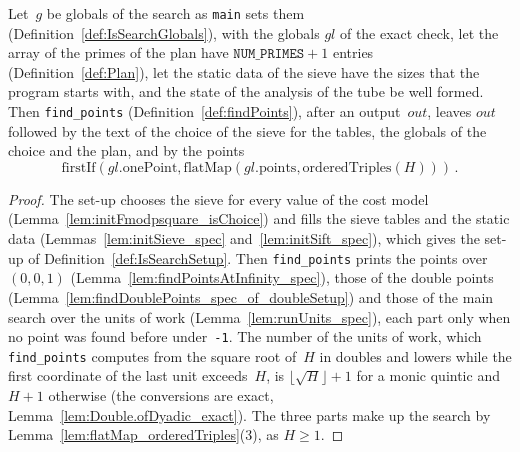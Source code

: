 \begin{lemma}\label{lem:findPoints_spec}
  \leanok
  Let~$g$ be globals of the search as \texttt{main} sets them
  (Definition~\ref{def:IsSearchGlobals}), with the globals $\mathit{gl}$ of the exact check, let
  the array of the primes of the plan have $\texttt{NUM\_PRIMES} + 1$ entries
  (Definition~\ref{def:Plan}), let the static data of the sieve have the sizes that the program
  starts with, and the state of the analysis of the tube be well formed. Then
  \texttt{find\_points} (Definition~\ref{def:findPoints}), after an output~$\mathit{out}$, leaves
  $\mathit{out}$ followed by the text of the choice of the sieve for the tables, the globals of the
  choice and the plan, and by the points
  \[ \mathrm{firstIf}(\mathit{gl}.\mathrm{onePoint}, \mathrm{flatMap}(\mathit{gl}.\mathrm{points},
     \mathrm{orderedTriples}(H)))\,. \]
\end{lemma}

\begin{proof}
  \leanok
  The set-up chooses the sieve for every value of the cost model
  (Lemma~\ref{lem:initFmodpsquare_isChoice}) and fills the sieve tables and the static data
  (Lemmas~\ref{lem:initSieve_spec} and~\ref{lem:initSift_spec}), which gives the set-up of
  Definition~\ref{def:IsSearchSetup}. Then \texttt{find\_points} prints the points over
  $(0, 0, 1)$ (Lemma~\ref{lem:findPointsAtInfinity_spec}), those of the double points
  (Lemma~\ref{lem:findDoublePoints_spec_of_doubleSetup}) and those of the main search over the
  units of work (Lemma~\ref{lem:runUnits_spec}), each part only when no point was found before
  under~\texttt{-1}. The number of the units of work, which \texttt{find\_points} computes from the
  square root of~$H$ in doubles and lowers while the first coordinate of the last unit exceeds~$H$,
  is $\lfloor\sqrt{H}\rfloor + 1$ for a monic quintic and $H + 1$ otherwise (the conversions are
  exact, Lemma~\ref{lem:Double.ofDyadic_exact}). The three parts make up the search by
  Lemma~\ref{lem:flatMap_orderedTriples}(3), as $H \ge 1$.
\end{proof}

